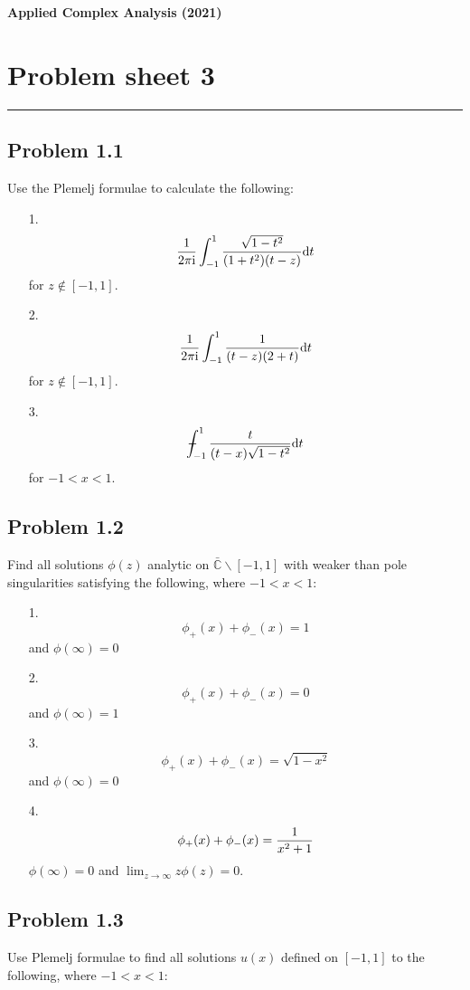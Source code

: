 \documentclass[12pt,a4paper]{article}
\def\D{ {\rm d} }
\def\I{ {\rm i} }
\def\C{ {\mathbb C} }
\def\Xint#1{ \mathchoice
   {\XXint\displaystyle\textstyle{#1} }%
   {\XXint\textstyle\scriptstyle{#1} }%
   {\XXint\scriptstyle\scriptscriptstyle{#1} }%
   {\XXint\scriptscriptstyle\scriptscriptstyle{#1} }%
   \!\int}
\def\XXint#1#2#3{ {\setbox0=\hbox{$#1{#2#3}{\int}$}
     \vcenter{\hbox{$#2#3$}}\kern-.5\wd0} }
\def\dashint{\Xint-}
\def\dt{\D t}
\begin{document}
\textbf{Applied Complex Analysis (2021)}

\section{Problem sheet 3}
\rule{\textwidth}{1pt}
\subsection{Problem 1.1}
Use the Plemelj formulae to calculate the following:

\begin{itemize}
\item[1. ] \[
{1 \over 2 \pi \I} \int_{-1}^1 {\sqrt{1-t^2} \over (1+t^2)(t -z)} \dt
\]
for $z \notin [-1,1]$.


\item[2. ] \[
{1 \over 2 \pi \I} \int_{-1}^1 {1 \over (t -z) (2+t)} \dt
\]
for $z \notin [-1,1]$.


\item[3. ] \[
\dashint_{-1}^1 {t \over (t -x) \sqrt{1-t^2} } \dt
\]
for $-1 < x < 1$.

\end{itemize}
\subsection{Problem 1.2}
Find all solutions $\phi(z)$ analytic on $\bar \C \backslash [-1,1]$ with weaker than pole singularities satisfying the following, where $-1 < x <1$:

\begin{itemize}
\item[1. ] \[
\phi_+(x) + \phi_-(x) = 1
\]
and $\phi(\infty) = 0$


\item[2. ] \[
\phi_+(x) + \phi_-(x) = 0
\]
and $\phi(\infty) = 1$


\item[3. ] \[
\phi_+(x) + \phi_-(x) = \sqrt{1-x^2}
\]
and $\phi(\infty) = 0$


\item[4. ] \[
\phi_+(x) + \phi_-(x) = {1 \over x^2 + 1}
\]
$\phi(\infty) = 0$ and $\lim_{z \rightarrow \infty} z \phi(z) = 0$.

\end{itemize}
\subsection{Problem 1.3}
Use Plemelj formulae to find all solutions $u(x)$ defined on $[-1,1]$ to the following, where $-1 < x < 1$:
\end{document}
